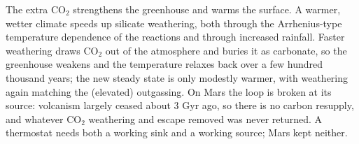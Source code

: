 \begin{solution}
The extra $\mathrm{CO_2}$ strengthens the greenhouse and warms the surface.
A warmer, wetter climate speeds up silicate weathering, both through the Arrhenius-type temperature
dependence of the reactions and through increased rainfall.
Faster weathering draws $\mathrm{CO_2}$ out of the atmosphere and buries it as carbonate, so the
greenhouse weakens and the temperature relaxes back over a few hundred thousand years; the new steady
state is only modestly warmer, with weathering again matching the (elevated) outgassing.
On Mars the loop is broken at its source: volcanism largely ceased about 3 Gyr ago, so there is no
carbon resupply, and whatever $\mathrm{CO_2}$ weathering and escape removed was never returned.
A thermostat needs both a working sink and a working source; Mars kept neither.
\end{solution}

